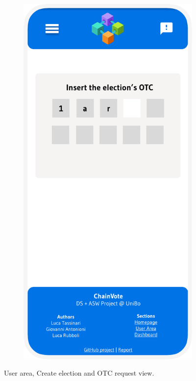 \documentclass{scrartcl}
\begin{document}
\begin{figure}
\begin{subfigure}[b]{0.3\textwidth}
    \end{subfigure}
    \hfill
    \begin{subfigure}[b]{0.3\textwidth}
        \centering
        \includegraphics[width=\textwidth]{./figures/mockups/otc.pdf}
    \end{subfigure}
    \caption{User area, Create election and OTC request view.}
    \label{fig:user-area-view}
\end{figure}
\end{document}
